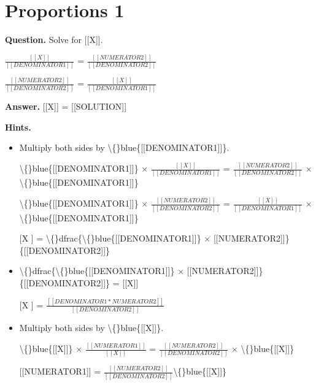 \documentclass{article}
\begin{document}
\section*{Proportions 1}
\textbf{Question.} Solve for [[X]].
                    
                        $\frac{[[X]]}{[[DENOMINATOR1]]}$ = $\frac{[[NUMERATOR2]]}{[[DENOMINATOR2]]}$
                    
                    
                        $\frac{[[NUMERATOR2]]}{[[DENOMINATOR2]]}$ = $\frac{[[X]]}{[[DENOMINATOR1]]}$

\textbf{Answer.} [[X]] =
                        [[SOLUTION]]

\textbf{Hints.}
\begin{itemize}
  \item Multiply both sides by \textbackslash\{\}blue\{[[DENOMINATOR1]]\}.
                        
                            \textbackslash\{\}blue\{[[DENOMINATOR1]]\} $\times$ $\frac{[[X]]}{[[DENOMINATOR1]]}$ = 
                            $\frac{[[NUMERATOR2]]}{[[DENOMINATOR2]]}$ $\times$ \textbackslash\{\}blue\{[[DENOMINATOR1]]\}
                        
                        
                            \textbackslash\{\}blue\{[[DENOMINATOR1]]\} $\times$ $\frac{[[NUMERATOR2]]}{[[DENOMINATOR2]]}$ =
                            $\frac{[[X]]}{[[DENOMINATOR1]]}$ $\times$ \textbackslash\{\}blue\{[[DENOMINATOR1]]\}
  \item [[X]] = \textbackslash\{\}dfrac\{\textbackslash\{\}blue\{[[DENOMINATOR1]]\} $\times$ [[NUMERATOR2]]\}\{[[DENOMINATOR2]]\}
  \item \textbackslash\{\}dfrac\{\textbackslash\{\}blue\{[[DENOMINATOR1]]\} $\times$ [[NUMERATOR2]]\}\{[[DENOMINATOR2]]\} = [[X]]
  \item [[X]] = $\frac{[[DENOMINATOR1 * NUMERATOR2]]}{[[DENOMINATOR2]]}$
  \item Multiply both sides by \textbackslash\{\}blue\{[[X]]\}.
                            
                                \textbackslash\{\}blue\{[[X]]\} $\times$ $\frac{[[NUMERATOR1]]}{[[X]]}$ = 
                                $\frac{[[NUMERATOR2]]}{[[DENOMINATOR2]]}$ $\times$ \textbackslash\{\}blue\{[[X]]\}
                            
                        
                        
                            [[NUMERATOR1]] = $\frac{[[NUMERATOR2]]}{[[DENOMINATOR2]]}$\textbackslash\{\}blue\{[[X]]\}
                        

\end{itemize}
\end{document}
